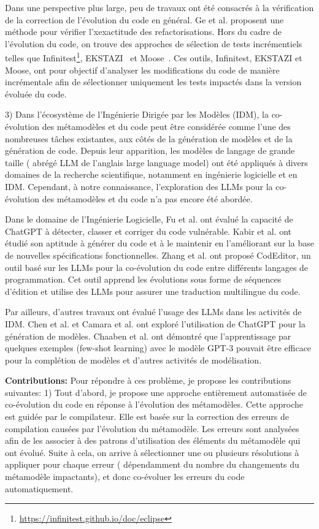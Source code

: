 Dans une perspective plus large, peu de travaux ont été consacrés à la vérification de la correction de l’évolution du code en général.
Ge et al. \cite{10.1145/2568225.2568280} proposent une méthode pour vérifier l'xexactitude des refactorisations. Hors du cadre de l’évolution du code, on trouve des approches de sélection de tests incrémentiels telles que Infinitest\footnote{\url{https://infinitest.github.io/doc/eclipse}}, EKSTAZI~\cite{7203050} et Moose~\cite{ducasse2000moose}. Ces outils, Infinitest, EKSTAZI et Moose, ont pour objectif d'analyser les modifications du code de manière incrémentale afin de sélectionner uniquement les tests impactés dans la version évoluée du code.

3) Dans l’écosystème de l’Ingénierie Dirigée par les Modèles (IDM), la co-évolution des métamodèles et du code peut être considérée comme l’une des nombreuses tâches existantes, aux côtés de la génération de modèles et de la génération de code. Depuis leur apparition, les modèles de langage de grande taille ( abrégé LLM de l'anglais large language model) ont été appliqués à divers domaines de la recherche scientifique, notamment en ingénierie logicielle et en IDM. Cependant, à notre connaissance, l’exploration des LLMs pour la co-évolution des métamodèles et du code n’a pas encore été abordée.

Dans le domaine de l’Ingénierie Logicielle, Fu et al. \cite{fu2023chatgpt} ont évalué la capacité de ChatGPT à détecter, classer et corriger du code vulnérable. Kabir et al. \cite{kabir2023empirical} ont étudié son aptitude à générer du code et à le maintenir en l’améliorant sur la base de nouvelles spécifications fonctionnelles. Zhang et al. \cite{zhang2023multilingual} ont proposé CodEditor, un outil basé sur les LLMs pour la co-évolution du code entre différents langages de programmation. Cet outil apprend les évolutions sous forme de séquences d’édition et utilise des LLMs pour assurer une traduction multilingue du code.

Par ailleurs, d’autres travaux ont évalué l’usage des LLMs dans les activités de IDM. Chen et al. \cite{10344012} et Camara et al. \cite{camara2023assessment} ont exploré l’utilisation de ChatGPT pour la génération de modèles. Chaaben et al. \cite{chaaben2023towards} ont démontré que l’apprentissage par quelques exemples (few-shot learning) avec le modèle GPT-3 pouvait être efficace pour la complétion de modèles et d’autres activités de modélisation.

\textbf{Contributions:} Pour répondre à ces problème, je propose les contributions suivantes:
1) Tout d’abord, je propose une approche entièrement automatisée de co-évolution du code en réponse à l’évolution des métamodèles. Cette approche est guidée par le compilateur. Elle est basée sur la correction des erreurs de compilation causées par l'évolution du métamodèle. Les erreurs sont analysées afin de les associer à des patrons d'utilisation des éléments du métamodèle qui ont évolué. Suite à cela, on arrive à sélectionner une ou plusieurs résolutions à appliquer pour chaque erreur ( dépendamment du nombre du changements du métamodèle impactants), et donc co-évoluer les erreurs du code automatiquement. 

